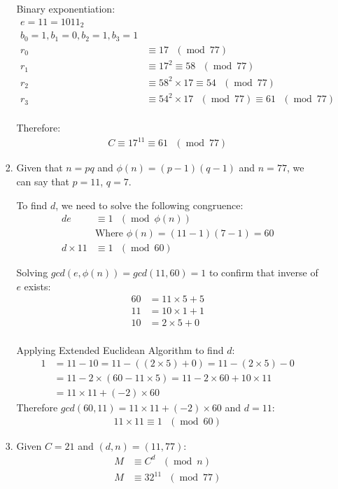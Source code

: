 \documentclass[11pt]{article}
\theoremstyle{definition}
\renewcommand{\pmod}[1]{\mbox{\ $(\ensuremath{\operatorname{mod}}\ {#1})$}}
\begin{document}
\begin{enumerate}
\begin{enumerate}
\begin{enumerate}
        Binary exponentiation:
        \begin{align*}
          e = 11 = 1011_{2} \\
          b_0 = 1, b_1 = 0, b_2 = 1, b_3 = 1 \\
          r_0 &\equiv 17 \pmod{77} \\
          r_1 &\equiv 17^2 \equiv 58 \pmod{77} \\
          r_2 &\equiv 58^2 \times 17 \equiv 54 \pmod{77}  \\
          r_3 &\equiv 54^2 \times 17 \pmod{77} \equiv 61 \pmod{77}  \\
        \end{align*}

        Therefore:
        \begin{align*}
          C \equiv 17^{11} \equiv 61 \pmod{77}
        \end{align*}
      \item
        Given that $n = pq$ and $\phi{(n)} = (p - 1)(q - 1)$ and $n = 77$, we can say that $p = 11$, $q = 7$.

        To find $d$, we need to solve the following congruence:
        \begin{align*}
          de &\equiv 1 \pmod{\phi{(n)}} \\
             &\text{Where } \phi{(n)} = (11 - 1)(7 - 1) = 60 \\
          d \times 11 &\equiv 1 \pmod{60}
        \end{align*}

        Solving $gcd(e, \phi{(n)}) = gcd(11, 60) = 1$ to confirm that inverse of $e$ exists:
        \begin{align*}
          60 &= 11 \times 5 + 5 \\
          11 &= 10 \times 1 + 1 \\
          10 &= 2 \times 5 + 0 \\
        \end{align*}

        Applying Extended Euclidean Algorithm to find $d$:
        \begin{align*}
          1 &= 11 - 10 = 11 - ((2 \times 5) + 0) = 11 - (2 \times 5) - 0 \\
            &= 11 - 2 \times (60 - 11 \times 5) = 11 - 2 \times 60 + 10 \times 11 \\
            &= 11 \times 11 + (-2) \times 60
        \end{align*}
        Therefore $gcd(60, 11) = 11 \times 11 + (-2) \times 60$ and $d = 11$:
        \begin{align*}
          11 \times 11 \equiv 1 \pmod{60}
        \end{align*}
      \item
        Given $C = 21$ and $(d, n) = (11, 77)$:
        \begin{align*}
          M &\equiv C^d \pmod{n} \\
          M &\equiv 32^{11} \pmod{77}
        \end{align*}


\end{enumerate}
\end{enumerate}
\end{enumerate}
\end{document}
